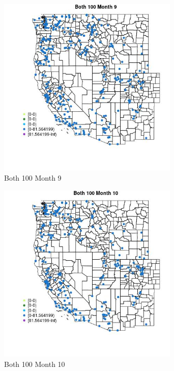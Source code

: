 \begin{figure} 
\centering  
\includegraphics[width=0.77\textwidth]{Code_Outputs/Report_ML_input_PM25_Step4_part_e_de_duplicated_aveswNAs_MapObsMo9Both_100.jpg} 
\caption{\label{fig:Report_ML_input_PM25_Step4_part_e_de_duplicated_aveswNAsMapObsMo9Both_100}Both 100 Month 9} 
\end{figure} 
 

\begin{figure} 
\centering  
\includegraphics[width=0.77\textwidth]{Code_Outputs/Report_ML_input_PM25_Step4_part_e_de_duplicated_aveswNAs_MapObsMo10Both_100.jpg} 
\caption{\label{fig:Report_ML_input_PM25_Step4_part_e_de_duplicated_aveswNAsMapObsMo10Both_100}Both 100 Month 10} 
\end{figure} 
 


